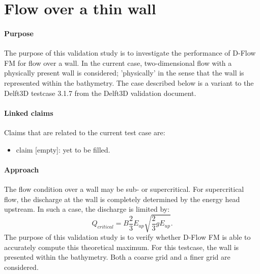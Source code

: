 \section{Flow over a thin wall}


\paragraph*{Purpose}
The purpose of this validation study is to investigate the performance of D-Flow FM for flow over a wall. In the current case, two-dimensional flow with a physically present wall is considered; 'physically' in the sense that the wall is represented within the bathymetry. The case described below is a variant to the Delft3D testcase 3.1.7 from the Delft3D validation document.



\paragraph*{Linked claims}
Claims that are related to the current test case are:
\begin{itemize}
\item claim [empty]: yet to be filled.
\end{itemize}




\paragraph*{Approach}
The flow condition over a wall may be sub- or supercritical. For supercritical flow, the discharge at the wall is completely determined by the energy head upstream. In such a case, the discharge is limited by:
\begin{equation}
Q_{critical} = B\frac{2}{3}E_{up}\sqrt{\frac{2}{3}gE_{up}}.
\end{equation}
The purpose of this validation study is to verify whether D-Flow FM is able to accurately compute this theoretical maximum. For this testcase, the wall is presented within the bathymetry. Both a coarse grid and a finer grid are considered.






